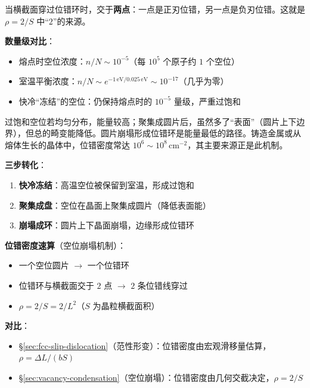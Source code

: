 \begin{insightbox}
当横截面穿过位错环时，交于\textbf{两点}：一点是正刃位错，另一点是负刃位错。这就是 $\rho=2/S$ 中``$2$''的来源。

\textbf{数量级对比}：
\begin{itemize}
    \item 熔点时空位浓度：$n/N \sim 10^{-5}$（每 $10^{5}$ 个原子约 $1$ 个空位）
    \item 室温平衡浓度：$n/N \sim e^{-1\,\mathrm{eV}/0.025\,\mathrm{eV}} \sim 10^{-17}$（几乎为零）
    \item 快冷``冻结''的空位：仍保持熔点时的 $10^{-5}$ 量级，严重过饱和
\end{itemize}

过饱和空位若均匀分布，能量较高；聚集成圆片后，虽然多了``表面''（圆片上下边界），但总的畸变能降低。圆片崩塌形成位错环是能量最低的路径。铸造金属或从熔体生长的晶体中，位错密度常达 $10^{6}\sim 10^{8}\,\mathrm{cm^{-2}}$，其主要来源正是此机制。
\end{insightbox}

\begin{thinkbox}
\textbf{三步转化}：
\begin{enumerate}
    \item \textbf{快冷冻结}：高温空位被保留到室温，形成过饱和
    \item \textbf{聚集成盘}：空位在晶面上聚集成圆片（降低表面能）
    \item \textbf{崩塌成环}：圆片上下晶面崩塌，边缘形成位错环
\end{enumerate}

\textbf{位错密度速算}（空位崩塌机制）：
\begin{itemize}
    \item 一个空位圆片 $\rightarrow$ 一个位错环
    \item 位错环与横截面交于 $2$ 点 $\rightarrow$ $2$ 条位错线穿过
    \item $\rho = 2/S = 2/L^{2}$（$S$ 为晶粒横截面积）
\end{itemize}

\textbf{对比}：
\begin{itemize}
    \item \S\ref{sec:fcc-slip-dislocation}（范性形变）：位错密度由宏观滑移量估算，$\rho = \Delta L/(bS)$
    \item \S\ref{sec:vacancy-condensation}（空位崩塌）：位错密度由几何交截决定，$\rho = 2/S$
\end{itemize}
\end{thinkbox}
